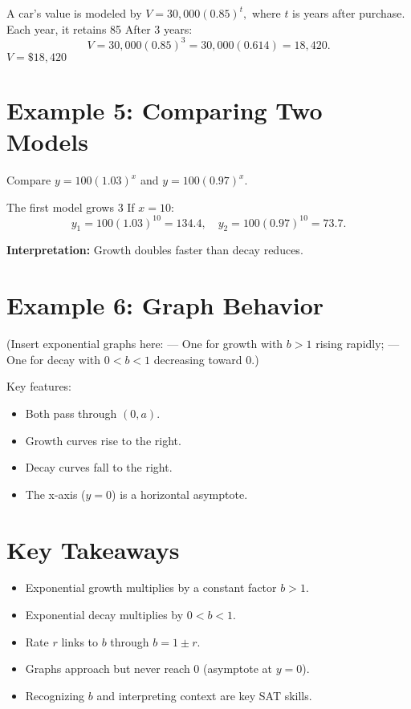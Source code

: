 \documentclass[12pt]{article}
\begin{document}
A car’s value is modeled by \(V = 30{,}000(0.85)^t,\) where \(t\) is years after purchase.  
Each year, it retains 85%
After 3 years:
\[
V = 30{,}000(0.85)^3 = 30{,}000(0.614) = 18{,}420.
\]
\(\boxed{V = \$18{,}420}\)

\section*{Example 5: Comparing Two Models}

Compare \(y = 100(1.03)^x\) and \(y = 100(0.97)^x.\)

The first model grows 3%
If \(x = 10\):
\[
y_1 = 100(1.03)^{10} = 134.4, \quad y_2 = 100(0.97)^{10} = 73.7.
\]

\textbf{Interpretation:} Growth doubles faster than decay reduces.

\section*{Example 6: Graph Behavior}

(Insert exponential graphs here:  
— One for growth with \(b > 1\) rising rapidly;  
— One for decay with \(0 < b < 1\) decreasing toward 0.)

Key features:
\begin{itemize}
  \item Both pass through \((0, a)\).
  \item Growth curves rise to the right.
  \item Decay curves fall to the right.
  \item The x-axis (\(y = 0\)) is a horizontal asymptote.
\end{itemize}

\section*{Key Takeaways}
\begin{itemize}
  \item Exponential growth multiplies by a constant factor \(b > 1\).
  \item Exponential decay multiplies by \(0 < b < 1\).
  \item Rate \(r\) links to \(b\) through \(b = 1 \pm r.\)
  \item Graphs approach but never reach 0 (asymptote at \(y = 0\)).
  \item Recognizing \(b\) and interpreting context are key SAT skills.
\end{itemize}
\end{document}
